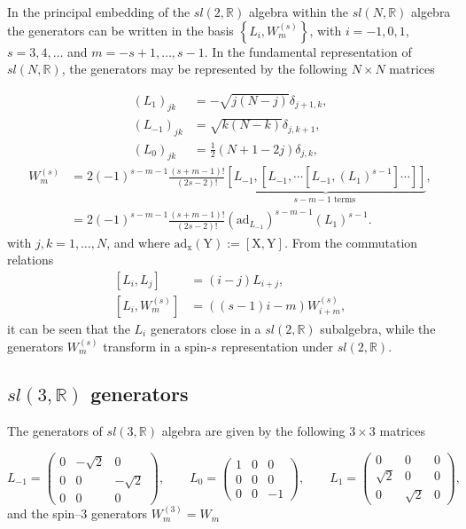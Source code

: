 \documentclass[letterpaper,11pt,oneside]{book}
\begin{document}
In the principal embedding of the $sl(2,\mathbb{R})$ algebra within
the $sl(N,\mathbb{R})$ algebra the generators can be written in the
basis \emph{$\left\{ L_{i},W_{m}^{(s)}\right\} $}, with $i=-1,0,1$,
$s=3,4,\dots$ and $m=-s+1,\dots,s-1$. In the fundamental representation
of $sl(N,\mathbb{R})$, the generators may be represented by the following
$N\times N$ matrices

\[
\begin{aligned}\left(L_{1}\right)_{jk} & =-\sqrt{j\left(N-j\right)}\delta_{j+1,k},\\
	\left(L_{-1}\right)_{jk} & =\sqrt{k\left(N-k\right)}\delta_{j,k+1},\\
	\left(L_{0}\right)_{jk} & =\frac{1}{2}\left(N+1-2j\right)\delta_{j,k},
\end{aligned}
\]
\[
\begin{aligned}W_{m}^{(s)} & =2\left(-1\right)^{s-m-1}\frac{\left(s+m-1\right)!}{\left(2s-2\right)!}\underbrace{\left[L_{-1},\left[L_{-1},\cdots\left[L_{-1},\left(L_{1}\right)^{s-1}\right]\cdots\right]\right]}_{s-m-1\text{ terms }},\\
	& =2\left(-1\right)^{s-m-1}\frac{\left(s+m-1\right)!}{\left(2s-2\right)!}\left(\mathrm{ad}_{L_{-1}}\right)^{s-m-1}\left(L_{1}\right)^{s-1}.
\end{aligned}
\]
with $j,k=1,\dots,N$, and where \emph{$\mathrm{ad}_{\mathrm{x}}\left(\mathrm{Y}\right):=\left[\mathrm{X},\mathrm{Y}\right]$.}
From the commutation relations
\[
\begin{aligned}\left[L_{i},L_{j}\right] & =\left(i-j\right)L_{i+j},\\
	\left[L_{i},W_{m}^{(s)}\right] & =\left(\left(s-1\right)i-m\right)W_{i+m}^{(s)},
\end{aligned}
\]
it can be seen that the $L_{i}$ generators close in a $sl(2,\mathbb{R})$
subalgebra, while the generators $W_{m}^{(s)}$ transform in a spin-$s$
representation under $sl(2,\mathbb{R})$.

\subsection*{$sl(3,\mathbb{R})$ generators}

The generators of $sl(3,\mathbb{R})$ algebra are given by the following
$3\times3$ matrices

\[
L_{-1}=\left(\begin{array}{ccc}
	0 & -\sqrt{2} & 0\\
	0 & 0 & -\sqrt{2}\\
	0 & 0 & 0
\end{array}\right),\quad\quad L_{0}=\left(\begin{array}{ccc}
	1 & 0 & 0\\
	0 & 0 & 0\\
	0 & 0 & -1
\end{array}\right),\quad\quad L_{1}=\left(\begin{array}{ccc}
	0 & 0 & 0\\
	\sqrt{2} & 0 & 0\\
	0 & \sqrt{2} & 0
\end{array}\right),
\]
and the spin--3 generators $W_{m}^{\left(3\right)}=W_{m}$
\end{document}
